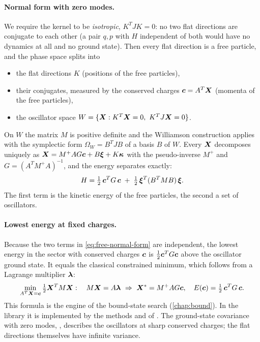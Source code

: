 \paragraph{Normal form with zero modes.} We require the kernel to be \emph{isotropic}, $K^TJK = 0$: no two flat
directions are conjugate to each other (a pair $q,p$ with $H$ independent of both would have no dynamics at all
and no ground state). Then every flat direction is a free particle, and the phase space splits into
\begin{itemize}
  \item the flat directions $K$ (positions of the free particles),
  \item their conjugates, measured by the conserved charges $\bm{c} = A^T\bm{X}$ (momenta of the free particles),
  \item the oscillator space $W = \{\bm{X} : K^T\bm{X} = 0,\ K^TJ\bm{X} = 0\}$.
\end{itemize}
On $W$ the matrix $M$ is positive definite and the Williamson construction applies with the symplectic form
$\Omega_W = B^TJB$ of a basis $B$ of $W$. Every $\bm{X}$ decomposes uniquely as
$\bm{X} = M^+ A G \bm{c} + B\bm{\xi} + K\bm{\kappa}$ with the pseudo-inverse $M^+$ and
$G = (A^T M^+ A)^{-1}$, and the energy separates exactly:
\begin{equation}\label{eq:free-normal-form}
  H = \tfrac12\, \bm{c}^T G\, \bm{c} \;+\; \tfrac12\, \bm{\xi}^T (B^TMB)\, \bm{\xi} .
\end{equation}
The first term is the kinetic energy of the free particles, the second a set of oscillators.

\paragraph{Lowest energy at fixed charges.} Because the two terms in \eqref{eq:free-normal-form} are independent,
the lowest energy in the sector with conserved charges $\bm{c}$ is $\frac12\bm{c}^TG\bm{c}$ above the
oscillator ground state. It equals the classical constrained minimum, which follows from a Lagrange multiplier
$\bm{\lambda}$:
\begin{equation}\label{eq:constrained-minimum}
  \min_{A^T\bm{X} = \bm{c}} \tfrac12 \bm{X}^T M \bm{X} : \quad M\bm{X} = A\bm{\lambda}
  \ \Rightarrow\ \bm{X}^* = M^+ A G \bm{c}, \quad E(\bm{c}) = \tfrac12\, \bm{c}^T G\, \bm{c} .
\end{equation}
This formula is the engine of the bound-state search (\cref{chap:bound}). In the library it is implemented by
the methods  and  of . The ground-state
covariance with zero
modes, , describes the oscillators at sharp conserved charges; the flat directions themselves
have infinite variance.

